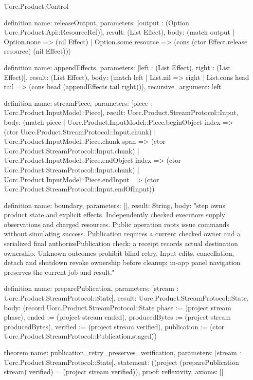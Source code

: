 \begin{lexlean}{Uorc.Product.Control}
\begin{semanticmodule}
definition{
  name: releaseOutput,
  parameters: [output : (Option Uorc.Product.Api::ResourceRef)],
  result: (List Effect),
  body: (match output
    | Option.none => (nil Effect)
    | Option.some resource => (cons (ctor Effect.release resource) (nil Effect)))
}

definition{
  name: appendEffects,
  parameters: [left : (List Effect), right : (List Effect)],
  result: (List Effect),
  body: (match left
    | List.nil => right
    | List.cons head tail => (cons head (appendEffects tail right))),
  recursive_argument: left
}

definition{
  name: streamPiece,
  parameters: [piece : Uorc.Product.InputModel::Piece],
  result: Uorc.Product.StreamProtocol::Input,
  body: (match piece
    | Uorc.Product.InputModel::Piece.beginObject index => (ctor Uorc.Product.StreamProtocol::Input.chunk)
    | Uorc.Product.InputModel::Piece.chunk span => (ctor Uorc.Product.StreamProtocol::Input.chunk)
    | Uorc.Product.InputModel::Piece.endObject index => (ctor Uorc.Product.StreamProtocol::Input.chunk)
    | Uorc.Product.InputModel::Piece.endInput => (ctor Uorc.Product.StreamProtocol::Input.endOfInput))
}

definition{
  name: boundary,
  parameters: [],
  result: String,
  body: "step owns product state and explicit effects. Independently checked executors supply observations and charged resources. Public operation roots issue commands without simulating success. Publication requires a current checked owner and a serialized final authorizePublication check; a receipt records actual destination ownership. Unknown outcomes prohibit blind retry. Input edits, cancellation, detach and shutdown revoke ownership before cleanup; in-app panel navigation preserves the current job and result."
}

definition{
  name: preparePublication,
  parameters: [stream : Uorc.Product.StreamProtocol::State],
  result: Uorc.Product.StreamProtocol::State,
  body: (record Uorc.Product.StreamProtocol::State {phase := (project stream phase), ended := (project stream ended), producedBytes := (project stream producedBytes), verified := (project stream verified), publication := (ctor Uorc.Product.StreamProtocol::Publication.staged)})
}

theorem{
  name: publication_retry_preserves_verification,
  parameters: [stream : Uorc.Product.StreamProtocol::State],
  statement: ((project (preparePublication stream) verified) = (project stream verified)),
  proof: reflexivity{},
  axioms: []
}


\end{semanticmodule}
\end{lexlean}
